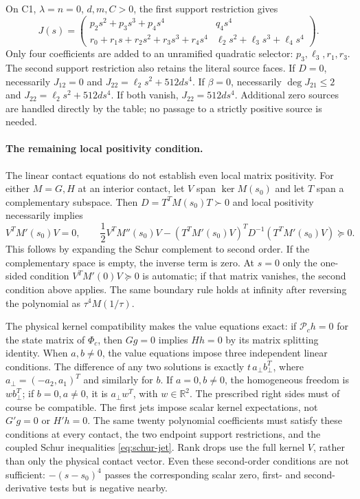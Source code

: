 \documentclass[11pt]{article}
\newcommand{\R}{\mathbb R}
\begin{document}
On C1, $\lambda=n=0$, $d,m,C>0$, the first support restriction gives
\begin{equation}
 J(s)=\begin{pmatrix}
 p_2s^2+p_3s^3+p_4s^4&q_4s^4\\
 r_0+r_1s+r_2s^2+r_3s^3+r_4s^4&\ell_2s^2+\ell_3s^3+\ell_4s^4
 \end{pmatrix}.                                    \label{eq:c1-form}
\end{equation}
Only four coefficients are added to an unramified quadratic selector:
$p_3,\ell_3,r_1,r_3$. The second support restriction also retains
the literal source faces. If $D=0$, necessarily
$J_{12}=0$ and $J_{22}=\ell_2s^2+512ds^4$.
If $\beta=0$, necessarily $\deg J_{21}\le2$ and
$J_{22}=\ell_2s^2+512ds^4$.
If both vanish, $J_{22}=512ds^4$.
Additional zero sources are handled directly by the table; no passage
to a strictly positive source is needed.

\paragraph{The remaining local positivity condition.}
The linear contact equations do not establish even local matrix
positivity. For either $M=G,H$ at an interior contact, let $V$ span
$\ker M(s_0)$ and let $T$ span a complementary subspace. Then
$D=T^TM(s_0)T\succ0$ and local positivity necessarily implies
\begin{equation}
 V^TM'(s_0)V=0,\qquad
 \frac12V^TM''(s_0)V
 -(T^TM'(s_0)V)^TD^{-1}(T^TM'(s_0)V)\succeq0.       \label{eq:schur-jet}
\end{equation}
This follows by expanding the Schur complement to second order.
If the complementary space is empty, the inverse term is zero.
At $s=0$ only the one-sided condition $V^TM'(0)V\succeq0$ is
automatic; if that matrix vanishes, the second condition above applies.
The same boundary rule holds at infinity after reversing the polynomial
as $\tau^4M(1/\tau)$.

The physical kernel compatibility makes the value equations exact:
if $\mathcal P_c h=0$ for the state matrix of $\Phi_c$, then $Gg=0$
implies $Hh=0$ by its matrix splitting identity.
When $a,b\ne0$, the value equations impose three independent linear
conditions. The difference of any two solutions is exactly
$t\,a_\perp b_\perp^T$, where $a_\perp=(-a_2,a_1)^T$ and similarly
for $b$. If $a=0,b\ne0$, the homogeneous freedom is
$w b_\perp^T$; if $b=0,a\ne0$, it is $a_\perp w^T$, with $w\in\R^2$.
The prescribed right sides must of course be compatible.
The first jets impose scalar kernel expectations, not $G'g=0$ or
$H'h=0$. The same twenty polynomial
coefficients must satisfy these conditions at every contact, the two
endpoint support restrictions, and the coupled Schur inequalities
\eqref{eq:schur-jet}. Rank drops use the full kernel $V$, rather than
only the physical contact vector. Even these second-order conditions
are not sufficient: $-(s-s_0)^4$ passes the corresponding scalar
zero, first- and second-derivative tests but is negative nearby.
\end{document}
